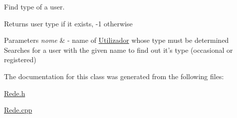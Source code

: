 Find type of a user. 

\begin{DoxyReturn}{Returns}
user type if it exists, -\/1 otherwise 
\end{DoxyReturn}

\begin{DoxyParams}{Parameters}
{\em nome} & -\/ name of \hyperlink{class_utilizador}{Utilizador} whose type must be determined Searches for a user with the given name to find out it's type (occasional or registered) \\
\hline
\end{DoxyParams}


The documentation for this class was generated from the following files\+:\begin{DoxyCompactItemize}
\item 
\hyperlink{_rede_8h}{Rede.\+h}\item 
\hyperlink{_rede_8cpp}{Rede.\+cpp}\end{DoxyCompactItemize}
